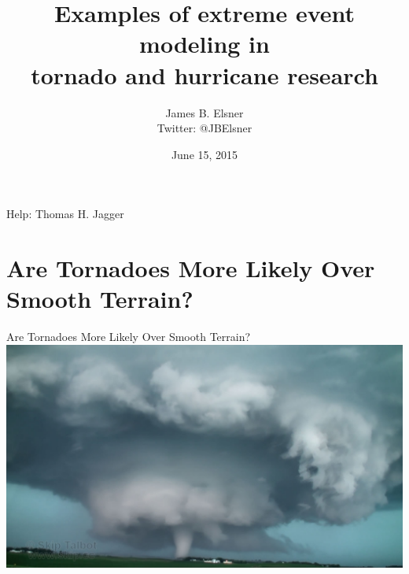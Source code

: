 \documentclass[handout]{beamer}
\title[EVA, Ann Arbor, MI 2015 \insertdate]{Examples of extreme event modeling in\\ tornado and hurricane research}
\author{James B. Elsner\\ Twitter: \alert{@JBElsner}}
\institute{Florida State University, Tallahassee, FL}
\date{June 15, 2015}
\begin{document}
\begin{frame}
\titlepage
Help: Thomas H. Jagger
\end{frame}

\section{Are Tornadoes More Likely Over Smooth Terrain?}

\begin{frame}
\begin{center}
{\Large Are Tornadoes More Likely Over Smooth Terrain?}\\
\vspace{.5cm}
\includegraphics[scale = .25]{figures/TornMeso2.jpg}
\end{center}
\end{frame}
\end{document}

